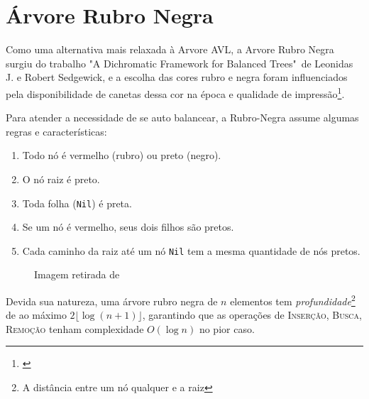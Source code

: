 \section{Árvore Rubro Negra}
\label{sec:rubro}

Como uma alternativa mais relaxada à Arvore AVL, a Arvore Rubro Negra surgiu do trabalho "A Dichromatic Framework for Balanced Trees"\ de Leonidas J. e Robert Sedgewick, e a escolha das cores rubro e negra foram influenciados pela disponibilidade de canetas dessa cor na época e qualidade de impressão\footnote{\cite{wikipedia_red_black_tree}}.

Para atender a necessidade de se auto balancear, a Rubro-Negra assume algumas regras e características:

\begin{enumerate}
	\item Todo nó é vermelho (rubro) ou preto (negro).
	\item O nó raiz é preto.
	\item Toda folha (\texttt{Nil}) é preta.
	\item Se um nó é vermelho, seus dois filhos são pretos.
	\item Cada caminho da raiz até um nó \texttt{Nil} tem a mesma quantidade de nós pretos.
\end{enumerate}

\begin{figure}[!ht]
	\centering
	\caption{Imagem retirada de \cite{cormen2022algorithms}}
	\label{fig:rubro_example}
\end{figure}
\FloatBarrier


Devida sua natureza, uma árvore rubro negra de $n$ elementos tem \textit{profundidade}\footnote{A distância entre um nó qualquer e a raiz} de ao máximo $2\lfloor\log (n + 1)\rfloor$, garantindo que as operações de \textrm{I\textsc{nserção}}, \textrm{B\textsc{usca}}, \textrm{R\textsc{emoção}} tenham complexidade $O(\log n)$ no pior caso.

